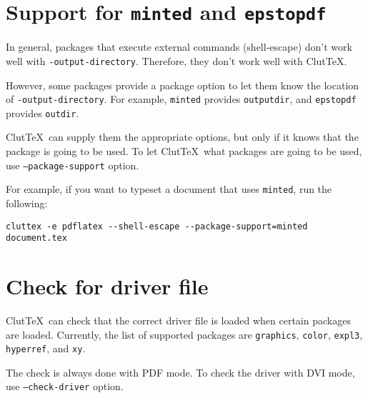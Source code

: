 \documentclass[a4paper]{report}
\newcommand\ClutTeX{Clut\TeX}
\newcommand\texpkg[1]{\texttt{#1}}
\begin{document}

\section{Support for \texpkg{minted} and \texpkg{epstopdf}}
In general, packages that execute external commands (shell-escape) don't work well with \texttt{-output-directory}.
Therefore, they don't work well with \ClutTeX.

However, some packages provide a package option to let them know the location of \texttt{-output-directory}.
For example, \texpkg{minted} provides \texttt{outputdir}, and \texpkg{epstopdf} provides \texttt{outdir}.

\ClutTeX\ can supply them the appropriate options, but only if it knows that the package is going to be used.
To let \ClutTeX\ what packages are going to be used, use \texttt{--package-support} option.

For example, if you want to typeset a document that uses \texpkg{minted}, run the following:
\begin{verbatim}
cluttex -e pdflatex --shell-escape --package-support=minted document.tex
\end{verbatim}

\section{Check for driver file}

\ClutTeX\ can check that the correct driver file is loaded when certain packages are loaded.
Currently, the list of supported packages are \texpkg{graphics}, \texpkg{color}, \texpkg{expl3}, \texpkg{hyperref}, and \texpkg{xy}.

The check is always done with PDF mode.
To check the driver with DVI mode, use \texttt{--check-driver} option.
\end{document}

